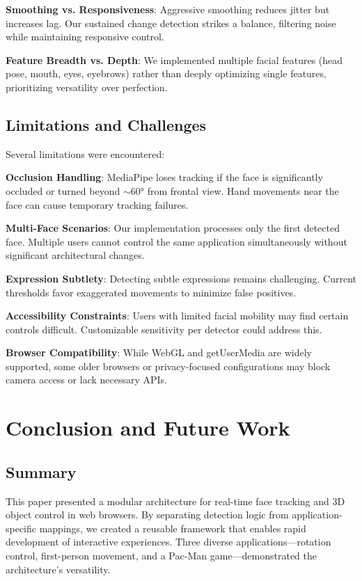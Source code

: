 \documentclass[sigconf]{acmart}
\begin{document}
\textbf{Smoothing vs. Responsiveness}: Aggressive smoothing reduces jitter but increases lag. Our sustained change detection strikes a balance, filtering noise while maintaining responsive control.

\textbf{Feature Breadth vs. Depth}: We implemented multiple facial features (head pose, mouth, eyes, eyebrows) rather than deeply optimizing single features, prioritizing versatility over perfection.

\subsection{Limitations and Challenges}

Several limitations were encountered:

\textbf{Occlusion Handling}: MediaPipe loses tracking if the face is significantly occluded or turned beyond $\sim$60° from frontal view. Hand movements near the face can cause temporary tracking failures.

\textbf{Multi-Face Scenarios}: Our implementation processes only the first detected face. Multiple users cannot control the same application simultaneously without significant architectural changes.

\textbf{Expression Subtlety}: Detecting subtle expressions remains challenging. Current thresholds favor exaggerated movements to minimize false positives.

\textbf{Accessibility Constraints}: Users with limited facial mobility may find certain controls difficult. Customizable sensitivity per detector could address this.

\textbf{Browser Compatibility}: While WebGL and getUserMedia are widely supported, some older browsers or privacy-focused configurations may block camera access or lack necessary APIs.

\section{Conclusion and Future Work}
\label{sec:conclusion}

\subsection{Summary}

This paper presented a modular architecture for real-time face tracking and 3D object control in web browsers. By separating detection logic from application-specific mappings, we created a reusable framework that enables rapid development of interactive experiences. Three diverse applications---rotation control, first-person movement, and a Pac-Man game---demonstrated the architecture's versatility.
\end{document}
